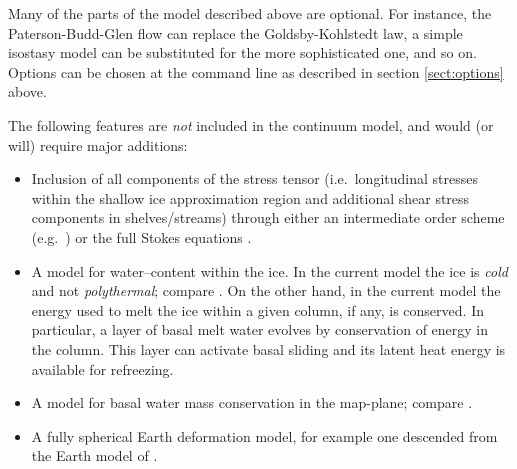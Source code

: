 \documentclass[11pt,final]{amsart}
\begin{document}
Many of the parts of the model described above are optional.  For instance, the Paterson-Budd-Glen \cite{PatersonBudd} flow can replace the Goldsby-Kohlstedt law, a simple isostasy model can be substituted for the more sophisticated one, and so on.  Options can be chosen at the command line as described in section \ref{sect:options} above.

The following features are \emph{not} included in the continuum model, and would (or will) require major additions:
\begin{itemize}
\item Inclusion of all components of the stress tensor (i.e.~longitudinal stresses within the shallow ice approximation region and additional shear stress components in shelves/streams) through either an intermediate order scheme (e.g.~\cite{Blatter,Hindmarsh06}) or the full Stokes equations \cite{Fowler}.
\item A model for water--content within the ice.  In the current model the ice is \emph{cold} and not \emph{polythermal}; compare \cite{Greve}.  On the other hand, in the current model the energy used to melt the ice within a given column, if any, is conserved.  In particular, a layer of basal melt water evolves by conservation of energy in the column.  This layer can activate basal sliding and its latent heat energy is available for refreezing.
\item A model for basal water mass conservation in the map-plane; compare \cite{JohnsonFastook}.
\item A fully spherical Earth deformation model, for example one descended from the Earth model of \cite{Peltier}.
\end{itemize}
\end{document}

